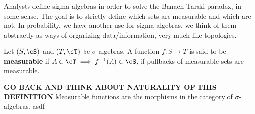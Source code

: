 Analysts define sigma algebras in order to solve the Banach-Tarski paradox, in some sense. The goal is to strictly define which sets are measurable and which are not. In probability, we have another use for sigma algebras, we think of them abstractly as ways of organizing data/information, very much like topologies.

\begin{defn}\label{defn:measurable-function}
  Let $(S,\cS)$ and $(T,\cT)$ be $\sigma$-algebras. A function $f:S\to T$ is said to be \textbf{measurable} if $A \in \cT \implies f^{-1}(A) \in \cS$, if pullbacks of measurable sets are measurable.
\end{defn}
\textbf{GO BACK AND THINK ABOUT NATURALITY OF THIS DEFINITION}
Measurable functions are the morphisms in the category of $\sigma$-algebras. asdf
\printbibliography

